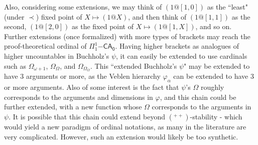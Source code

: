 \documentclass{article}
\theoremstyle{definition}
\theoremstyle{plain}
\theoremstyle{plain}
\theoremstyle{plain}
\theoremstyle{plain}
\theoremstyle{remark}
\theoremstyle{remark}
\theoremstyle{remark}
\theoremstyle{plain}
\theoremstyle{plain}
\begin{document}
Also, considering some extensions, we may think of $(1@[1,0])$ as the ``least" (under $\prec$) fixed point of $X \mapsto (1@X)$, and then think of $(1@[1,1])$ as the second, $(1@[2,0])$ as the fixed point of $X\mapsto (1@[1,X])$, and so on. Further extensions (once formalized) with more types of brackets may reach the proof-theoretical ordinal of $\Pi^1_1\mathsf{-CA_0}$. Having higher brackets as analogues of higher uncountables in Buchholz's $\psi$, it can easily be extended to use cardinals such as $\Omega_{\omega+1}$, $\Omega_\Omega$, and $\Omega_{\Omega_\Omega}$. This ``extended Buchholz's $\psi$" may be extended to have 3 arguments or more, as the Veblen hierarchy $\varphi_\alpha$ can be extended to have 3 or more arguments. Also of some interest is the fact that $\psi$'s $\Omega$ roughly corresponds to the arguments and dimensions in $\varphi$, and this chain could be further extended, with a new function whose $\Omega$ corresponds to the arguments in $\psi$. It is possible that this chain could extend beyond $(^{++})$-stability - which would yield a new paradigm of ordinal notations, as many in the literature are very complicated. However, such an extension would likely be too synthetic.

\printbibliography[heading=bibintoc,title={References}]
\end{document}
